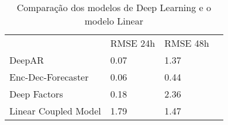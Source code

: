 \begin{center}
  \begin{table}[htbp]
    \caption{Comparação dos modelos de Deep Learning e o modelo Linear}
    \centering
  \begin{tabular}{l|lll}
    \cline{2-4}
    & \multicolumn{1}{l|}{RMSE 24h} & \multicolumn{1}{l|}{RMSE 48h} &   \\ \cline{1-4}
    \multicolumn{1}{|l|}{DeepAR}               &               0.07                &          1.37                                         &  \\ \cline{1-1}
    \multicolumn{1}{|l|}{Enc-Dec-Forecaster}   &                   0.06            &        0.44                                             &  \\ \cline{1-1}
    \multicolumn{1}{|l|}{Deep Factors}         &              0.18                 &           2.36                                &  \\ \cline{1-1}
    \multicolumn{1}{|l|}{Linear Coupled Model} &                  1.79             &       1.47                                            &  \\ \cline{1-1}
  \end{tabular}
  \end{table}
\end{center}
